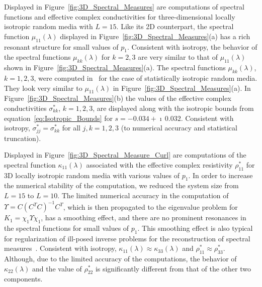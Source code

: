 \documentclass{cmslatex}
\begin{document}
Displayed in Figure~\ref{fig:3D_Spectral_Measures} are 
computations of spectral functions and effective complex
conductivities for three-dimensional locally isotropic random media
with $L=15$. Like its 2D counterpart, the spectral 
function $\mu_{11}(\lambda)$ displayed in
Figure~\ref{fig:3D_Spectral_Measures}(a) has a rich resonant structure
for small values of $p_1$. Consistent with isotropy, the behavior of the
spectral functions $\mu_{kk}(\lambda)$ for $k=2,3$ are very similar to that of
$\mu_{11}(\lambda)$ shown in Figure~\ref{fig:3D_Spectral_Measures}(a). The
spectral functions $\mu_{kk}(\lambda)$, $k=1,2,3$, were computed
in~\cite{Murphy:JMP:063506} for the case of statistically isotropic
random media. They look very similar to $\mu_{11}(\lambda)$ in
Figure~\ref{fig:3D_Spectral_Measures}(a). In
Figure~\ref{fig:3D_Spectral_Measures}(b) the values of the effective
complex conductivities $\sigma^*_{kk}$, $k=1,2,3$, are displayed along with the
isotropic bounds from equation~\eqref{eq:Isotropic_Bounds} for
$s=-0.034+\imath\,0.032$. Consistent with isotropy, $\sigma^*_{jj}=\sigma^*_{kk}$ for
all $j,k=1,2,3$ (to numerical accuracy and statistical truncation).




Displayed in Figure~\ref{fig:3D_Spectral_Measure_Curl} are 
computations of the spectral function $\kappa_{11}(\lambda)$ associated with the
effective complex resistivity $\rho^*_{11}$ for 3D
locally isotropic random media with various values of $p_1$. In order
to increase the numerical stability of the computation, we reduced the 
system size from $L=15$ to $L=10$. The limited numerical accuracy
in the computation of $\Upsilon=C(C^TC)^{-1}C^T$, which is then propagated to
the eigenvalue problem for $K_1=\chi_1\Upsilon\chi_1$, has a smoothing effect, and
there are no prominent resonances in the spectral functions for small
values of $p_1$. This smoothing effect is also typical for
regularization of ill-posed inverse problems for the reconstruction of
spectral measures~\cite{Cherkaev:IP-1203}. Consistent with isotropy,
$\kappa_{11}(\lambda)\approx\kappa_{33}(\lambda)$ and $\rho^*_{11}\approx\rho^*_{33}$. Although, due to the
limited accuracy of the computations, the behavior of $\kappa_{22}(\lambda)$ and
the value of $\rho^*_{22}$ is significantly different from that of the
other two components.  
 
\end{document}
